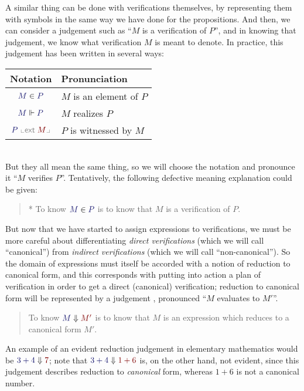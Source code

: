 A similar thing can be done with verifications themselves, by
representing them with symbols in the same way we have done for the
propositions. And then, we can consider a judgement such as ``$M$ is a
verification of $P$'', and in knowing that judgement, we know what
verification $M$ is meant to denote. In practice, this judgement has
been written in several ways:\\[10pt]
\begin{tabular}{c|l}
  Notation & Pronunciation \\ \hline
  $\InputMode{M}\in \InputMode{P}$ & $M$ is an element of $P$\\
  $\InputMode{M}\Vdash \InputMode{P}$ & $M$ realizes $P$\\
  $\InputMode{P}\ {\color{Gray}\llcorner\mathsf{ext}\;} \OutputMode{M}{\color{Gray}\lrcorner}$ & $P$ is witnessed by $M$
\end{tabular}\\

But they all mean the same thing, so we will choose the notation
 and pronounce it ``$M$ verifies $P$''. Tentatively, the
following defective meaning explanation could be given:
\begin{quote}
  * To know $\ver{M}{P}$ is to know that $M$ is a verification of $P$.
\end{quote}

But now that we have started to assign expressions to verifications,
we must be more careful about differentiating \emph{direct
verifications} (which we will call ``canonical'') from \emph{indirect
verifications} (which we will call ``non-canonical''). So the domain
of expressions must itself be accorded with a notion of reduction to
canonical form, and this corresponds with putting into action a plan
of verification in order to get a direct (canonical) verification;
reduction to canonical form will be represented by a judgement
, pronounced ``$M$ evaluates to $M'$''.

\begin{quote}
  To know $\reduce{M}{M'}$ is to know that $M$ is an expression which reduces to
  a canonical form $M'$.
\end{quote}

An example of an evident reduction judgement in elementary mathematics
would be $\reduce{3+4}{7}$; note that $\reduce{3+4}{1+6}$ is, on the
other hand, not evident, since this judgement describes reduction to
\emph{canonical} form, whereas $1+6$ is not a canonical number.

